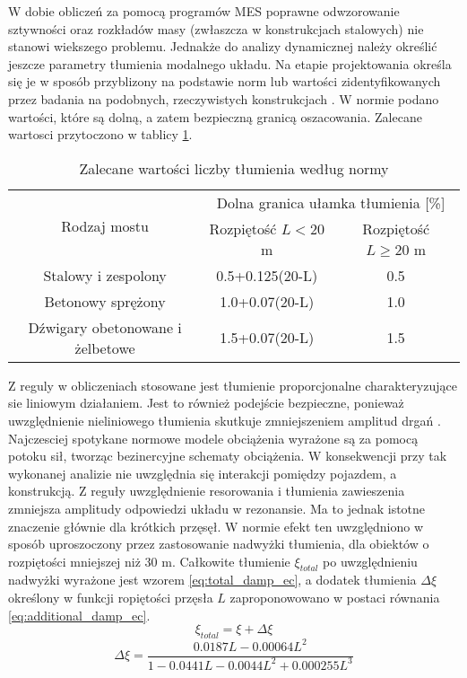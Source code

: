 W dobie obliczeń za pomocą programów MES poprawne odwzorowanie sztywności oraz rozkładów masy (zwłaszcza w konstrukcjach stalowych) nie stanowi wiekszego problemu. Jednakże do analizy dynamicznej należy określić jeszcze parametry tłumienia modalnego układu. Na etapie projektowania określa się je w sposób przyblizony na podstawie norm lub wartości zidentyfikowanych przez badania na podobnych, rzeczywistych konstrukcjach \parencite{Ladislav1996}. W normie \cite{PKNj} podano wartości, które są dolną, a zatem bezpieczną granicą oszacowania. Zalecane wartosci przytoczono w tablicy \ref{tab:damping_code_eurocode}. 
\begin{table}[]
	\centering
	\footnotesize
	\caption{Zalecane wartości liczby tłumienia według normy \cite{PKNj}}
	\begin{tabular}{@{}ccc@{}}
		\toprule
		\multirow{2}{*}{Rodzaj mostu}    & \multicolumn{2}{c}{Dolna granica ułamka tłumienia {[}\%{]}} \\ \cmidrule(l){2-3} 
		& Rozpiętość $L<20$m         & Rozpiętość $L\ge 20$ m         \\ \midrule
		Stalowy i zespolony              & 0.5+0.125(20-L)            & 0.5                            \\ \midrule
		Betonowy sprężony                & 1.0+0.07(20-L)             & 1.0                            \\ \midrule
		Dźwigary obetonowane i żelbetowe & 1.5+0.07(20-L)             & 1.5                            \\ \bottomrule
	\end{tabular}
	\label{tab:damping_code_eurocode}
\end{table}
Z reguly w obliczeniach stosowane jest tłumienie proporcjonalne charakteryzujące sie liniowym działaniem. Jest to również podejście bezpieczne, ponieważ uwzględnienie nieliniowego tłumienia skutkuje zmniejszeniem amplitud drgań \parencite{Ulker-Kaustell2012a,Oleszek2015}. Najczesciej spotykane normowe modele obciążenia wyrażone są za pomocą potoku sił, tworząc bezinercyjne schematy obciążenia. W konsekwencji przy tak wykonanej analizie nie uwzględnia się interakcji pomiędzy pojazdem, a konstrukcją. Z reguły uwzględnienie resorowania i tłumienia zawieszenia zmniejsza amplitudy odpowiedzi układu w rezonansie. Ma to jednak istotne znaczenie głównie dla krótkich przęsęł. W normie \cite{PKNj} efekt ten uwzględniono w sposób uproszoczony przez zastosowanie nadwyżki tłumienia, dla obiektów o rozpiętości mniejszej niż 30 m. Całkowite tłumienie $\xi_{total}$ po uwzględnieniu nadwyżki wyrażone jest wzorem \ref{eq:total_damp_ec}, a dodatek tłumienia $\Delta \xi$ określony w funkcji ropiętości przęsła $L$ zaproponowowano w postaci równania \ref{eq:additional_damp_ec}.
\begin{equation} \label{eq:total_damp_ec}
	\xi_{total}=\xi + \Delta \xi
\end{equation}
\begin{equation} \label{eq:additional_damp_ec}
	\Delta \xi =\frac{0.0187L-0.00064L^2}{1-0.0441L-0.0044L^2+0.000255L^3}
\end{equation}








